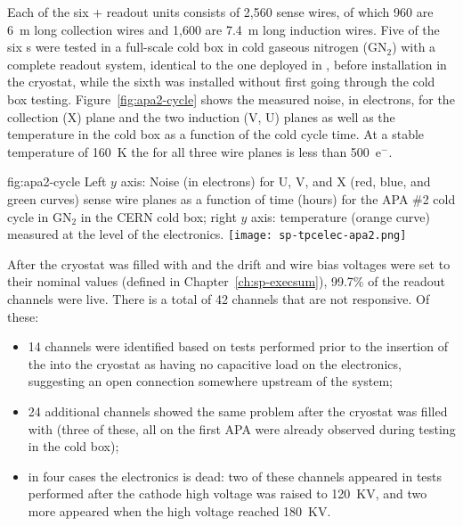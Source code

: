 
Each of the six  +
readout units consists of 2,560 sense wires, of which 960 are \SI{6}{m} 
long collection wires and 1,600 are \SI{7.4}{m} long induction wires. 
Five of the six s were tested in a full-scale cold box in 
cold gaseous nitrogen (GN$_2$) with a complete  readout system,  
identical to the one %
deployed in , before installation in the cryostat,
while the sixth %
 was installed without first going through the cold
box testing. Figure~\ref{fig:apa2-cycle} shows the measured noise, in 
electrons, for the collection (X) plane and the two induction (V, U) 
planes as well as the  temperature in the cold box as a 
function of the cold cycle time. At a stable temperature of 
\SI{160}{K} the  for all three wire planes is less than 500~e$^-$.

\begin{dunefigure}
{fig:apa2-cycle}
{Left $y$ axis: Noise (in electrons) for U, V, and X (red, blue, and green 
curves) sense wire planes as a function of time (hours) for the APA \#2 cold 
cycle in GN$_2$ in the CERN cold box; right $y$ axis: temperature 
(orange curve) measured at the level of the  electronics.}
\texttt{[image: sp-tpcelec-apa2.png]}
\end{dunefigure}
After the cryostat was filled with  and the drift and wire 
bias voltages were set to their nominal values (defined in Chapter~\ref{ch:sp-execsum}), 
99.7\% of the  readout channels were live.
There is a total of 42 channels that are not responsive. Of these:
\begin{itemize}
\item{14 channels were identified based on tests performed prior
to the insertion of the  into the cryostat as having
no capacitive load on the  electronics, suggesting an open 
connection somewhere upstream  of the  system;}
\item{24 additional channels showed the same problem after the
cryostat was filled with  (three of these, all on the
first APA were already observed during testing in the cold box);}
\item{in four cases the  electronics is dead: two of these
channels appeared in tests performed after the cathode high
voltage was raised to \SI{120}{KV}, and two more
appeared when the high voltage reached \SI{180}{KV}.}
\end{itemize}

